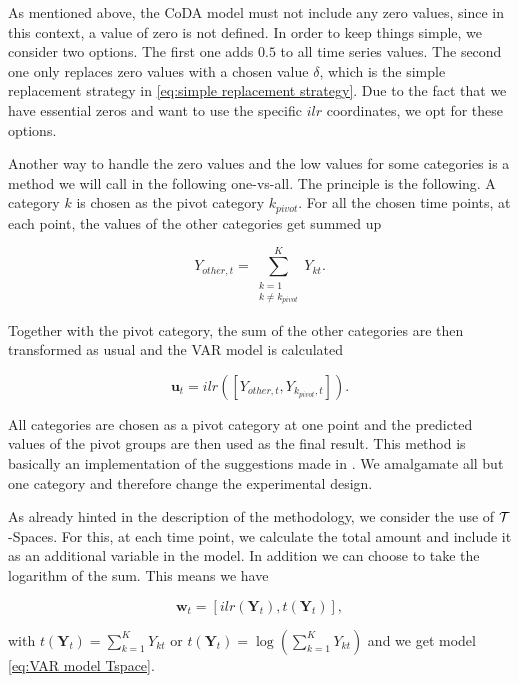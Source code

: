 As mentioned above, the CoDA model must not include any zero values, since in this context, a value of zero is not defined. In order to keep things simple, we consider two options. The first one adds $0.5$ to all time series values. The second one only replaces zero values with a chosen value $\delta$, which is the simple replacement strategy in \ref{eq:simple replacement strategy}. Due to the fact that we have essential zeros and want to use the specific $ilr$ coordinates, we opt for these options. 

Another way to handle the zero values and the low values for some categories is a method we will call in the following one-vs-all. The principle is the following. A category $k$ is chosen as the pivot category $k_{pivot}$. For all the chosen time points, at each point, the values of the other categories get summed up

\begin{equation}
Y_{other,t} = \sum_{\substack{k=1 \\ k \neq k_{pivot}}}^K Y_{kt}.
\label{eq:one vs all}
\end{equation}

Together with the pivot category, the sum of the other categories are then transformed as usual and the VAR model is calculated 

\begin{equation}
\bm{u}_t = ilr([Y_{other,t}, Y_{k_{pivot},t}]).
\label{eq:one vs all ilr}
\end{equation}


All categories are chosen as a pivot category at one point and the predicted values of the pivot groups are then used as the final result. This method is basically an implementation of the suggestions made in \cite{Aitchison:2003}. We amalgamate all but one category and therefore change the experimental design. 

As already hinted in the description of the methodology, we consider the use of $\mathcal{T}$-Spaces. For this, at each time point, we calculate the total amount and include it as an additional variable in the model. In addition we can choose to take the logarithm of the sum. This means we have 

\begin{equation}
\bm{w}_t = [ilr(\bm{Y}_t),t(\bm{Y}_t)],
\label{eq:Tspace u}
\end{equation}

with $t(\bm{Y}_t) = \sum_{k=1}^K Y_{kt}$ or $t(\bm{Y}_t) = \log\left(\sum_{k=1}^K Y_{kt}\right)$ and we get model \ref{eq:VAR model Tspace}.

